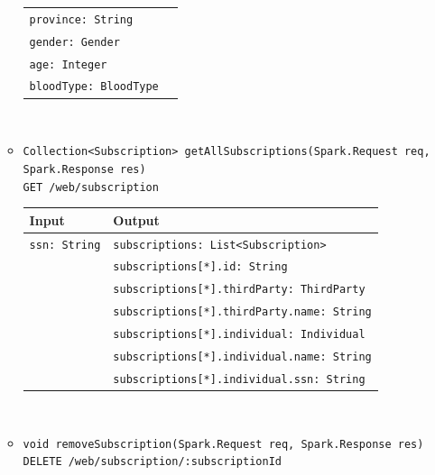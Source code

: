 \documentclass[a4paper, hidelinks, 12pt]{report}
\begin{document}
\begin{itemize}
\begin{itemize}
\begin{tabular}{l | l}
				\verb|province: String| & \\
				\verb|gender: Gender| & \\
				\verb|age: Integer| & \\
				\verb|bloodType: BloodType| & \\
			\end{tabular}\\
			\item{\verb|Collection<Subscription> getAllSubscriptions(Spark.Request req,|\\ \verb|Spark.Response res)|\\ \verb|GET /web/subscription|}\\
			\begin{tabular}{l | l}
			\textbf{Input} & \textbf{Output} \\
			\hline
				\verb|ssn: String| & \verb|subscriptions: List<Subscription>| \\
				& \verb|subscriptions[*].id: String| \\
				& \verb|subscriptions[*].thirdParty: ThirdParty| \\
				& \verb|subscriptions[*].thirdParty.name: String| \\
				& \verb|subscriptions[*].individual: Individual| \\
				& \verb|subscriptions[*].individual.name: String| \\
				& \verb|subscriptions[*].individual.ssn: String| \\
			\end{tabular}\\
			\item{\verb|void removeSubscription(Spark.Request req, Spark.Response res)|\\ \verb|DELETE /web/subscription/:subscriptionId|}
		\end{itemize}
	\end{itemize}
	
\end{document}
